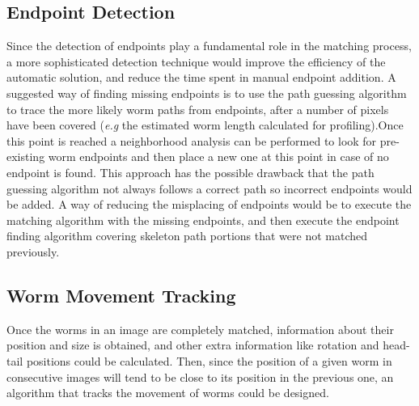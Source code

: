 \subsection*{Endpoint Detection}
Since the detection of endpoints play a fundamental role in the matching 
process, a more sophisticated detection technique would improve the 
efficiency of the automatic solution, and reduce the time spent in
manual endpoint addition. A suggested way of finding missing endpoints is
to use the path guessing algorithm to trace the more likely worm paths 
from endpoints, after a number of pixels have been covered (\emph{e.g} the
estimated worm length calculated for profiling).Once this point is reached
a neighborhood analysis can be performed to look for pre-existing 
worm endpoints and then place a new one at this point in case of no endpoint 
is found. This approach has the possible drawback that the path guessing
algorithm not always follows a correct path so incorrect endpoints would
be added. A way of reducing the misplacing of endpoints would be to execute
the matching algorithm with the missing endpoints, and then execute the 
endpoint finding algorithm covering skeleton path portions that were not 
matched previously.

\subsection*{Worm Movement Tracking}
Once the worms in an image are completely matched, information about their
position and size is obtained, and other extra information like rotation
and head-tail positions could be calculated. Then, since the position of 
a given worm in consecutive images will tend to be close to its position in
the previous one, an algorithm that tracks the movement of worms could be 
designed. 